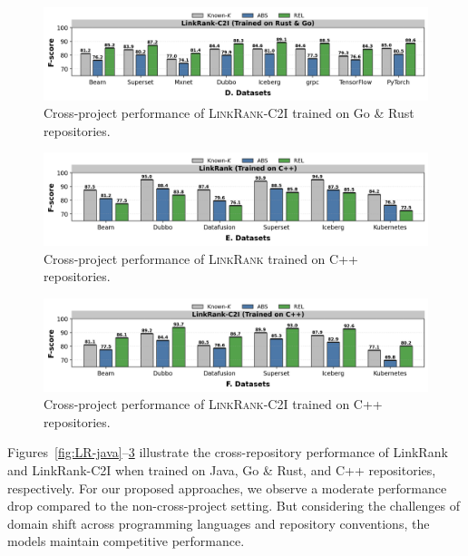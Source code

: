 \begin{figure}[H]
  \centering
  \includegraphics[width=\linewidth]{Figures/LR-C2I-rust.png}
  \caption{Cross-project performance of \textsc{LinkRank-C2I} trained on Go \& Rust repositories.}
  \label{fig:LR-C2I-rust}
\end{figure}


\begin{figure}[H]
  \centering
  \includegraphics[width=\linewidth]{Figures/LR-cpp.png}
  \caption{Cross-project performance of \textsc{LinkRank} trained on C++ repositories.}
  \label{fig:LR-cpp}
\end{figure}

\begin{figure}[H]
  \centering
  \includegraphics[width=\linewidth]{Figures/lr-C2I-cpp.png}
  \caption{Cross-project performance of \textsc{LinkRank-C2I} trained on C++ repositories.}
  \label{fig:LR-C2I-cpp}
\end{figure}

Figures~\ref{fig:LR-java}--\ref{fig:LR-C2I-cpp} illustrate the cross-repository performance of LinkRank and LinkRank-C2I when trained on Java, Go \& Rust, and C++ repositories, respectively. For our proposed approaches, we observe a moderate performance drop compared to the non-cross-project setting. But considering the challenges of domain shift across programming languages and repository conventions, the models maintain competitive performance.\\


